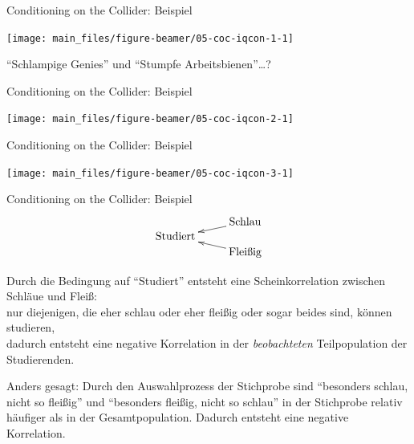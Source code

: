 \documentclass[
  10pt,
  ignorenonframetext,
]{beamer}
\begin{document}
\begin{frame}{Conditioning on the Collider: Beispiel}
\label{conditioning-on-the-collider-beispiel}
\scriptsize\normalsize

\scriptsize

\begin{center}\texttt{[image: main\_files/figure-beamer/05-coc-iqcon-1-1]} \end{center}

\normalsize

``Schlampige Genies'' und ``Stumpfe Arbeitsbienen''\ldots?
\end{frame}

\begin{frame}{Conditioning on the Collider: Beispiel}
\label{conditioning-on-the-collider-beispiel-1}
\scriptsize

\begin{center}\texttt{[image: main\_files/figure-beamer/05-coc-iqcon-2-1]} \end{center}

\normalsize
\end{frame}

\begin{frame}{Conditioning on the Collider: Beispiel}
\label{conditioning-on-the-collider-beispiel-2}
\scriptsize

\begin{center}\texttt{[image: main\_files/figure-beamer/05-coc-iqcon-3-1]} \end{center}

\normalsize
\end{frame}

\begin{frame}{Conditioning on the Collider: Beispiel}
\label{conditioning-on-the-collider-beispiel-3}
\[\xymatrix@R-2pc{
& \ar[dl] \text{Schlau}\\
\text{Studiert}  &\\
& \ar[ul] \text{Fleißig}}\]

Durch die Bedingung auf ``Studiert'' entsteht eine Scheinkorrelation
zwischen Schläue und Fleiß:\\
nur diejenigen, die eher schlau oder eher fleißig oder sogar beides
sind, können studieren,\\
dadurch entsteht eine negative Korrelation in der \emph{beobachteten}
Teilpopulation der Studierenden.

Anders gesagt: Durch den Auswahlprozess der Stichprobe sind ``besonders
schlau, nicht so fleißig'' und ``besonders fleißig, nicht so schlau'' in
der Stichprobe relativ häufiger als in der Gesamtpopulation. Dadurch
entsteht eine negative Korrelation.
\end{frame}
\end{document}
